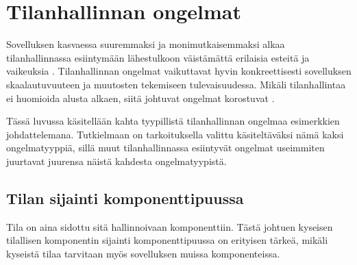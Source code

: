 \chapter{Tilanhallinnan ongelmat} \label{Tilanhallinnan ongelmat}

Sovelluksen kasvaessa suuremmaksi ja monimutkaisemmaksi alkaa tilanhallinnassa esiintymään lähestulkoon väistämättä erilaisia esteitä ja vaikeuksia \cite{kentcdodds1} \cite{ivakop}. Tilanhallinnan ongelmat vaikuttavat hyvin konkreettisesti sovelluksen skaalautuvuuteen ja muutosten tekemiseen tulevaisuudessa. Mikäli tilanhallintaa ei huomioida alusta alkaen, siitä johtuvat ongelmat korostuvat \cite{discussion}.

Tässä luvussa käsitellään kahta tyypillistä tilanhallinnan ongelmaa esimerkkien johdattelemana. Tutkielmaan on tarkoituksella valittu käsiteltäväksi nämä kaksi ongelmatyyppiä, sillä muut tilanhallinnassa esiintyvät ongelmat useimmiten juurtavat juurensa näistä kahdesta ongelmatyypistä.


\section{Tilan sijainti komponenttipuussa}
\label{Tilan sijainti komponenttipuussa}

Tila on aina sidottu sitä hallinnoivaan komponenttiin. Tästä johtuen kyseisen tilallisen komponentin sijainti komponenttipuussa on erityisen tärkeä, mikäli kyseistä tilaa tarvitaan myös sovelluksen muissa komponenteissa.


